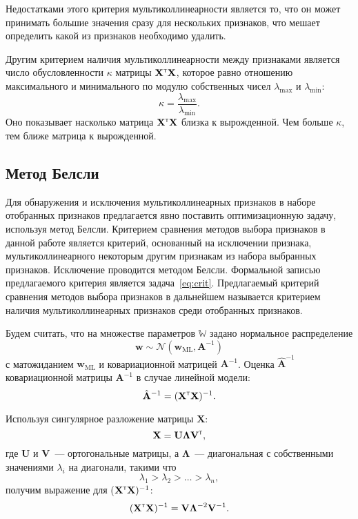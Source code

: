 \documentclass[a4paper,12pt]{article}
\newcommand{\bw}{\mathbf{w}}
\newcommand{\bX}{\mathbf{X}}
\newcommand{\bA}{\mathbf{A}}
\newcommand{\bU}{\mathbf{U}}
\newcommand{\bV}{\mathbf{V}}
\newcommand{\T}{{\text{\tiny\sffamily\upshape\mdseries T}}}
\begin{document}
Недостатками этого критерия мультиколлинеарности является то, что он может принимать большие значения сразу для нескольких признаков, что мешает определить какой из признаков необходимо удалить.   

Другим критерием наличия мультиколлинеарности между признаками является число обусловленности $\kappa$ матрицы $\bX^{\T}\bX$, которое равно отношению максимального и минимального по модулю собственных чисел $\lambda_{\mathrm{max}}$ и $\lambda_{\mathrm{min}}$:
\begin{equation*}
\kappa = \frac{\lambda_{\mathrm{max}}}{\lambda_{\mathrm{min}}}.
\label{eq:condnum}
\end{equation*} 
Оно показывает насколько матрица $\bX^{\T}\bX$ близка к вырожденной. Чем больше $\kappa$, тем ближе матрица к вырожденной.   

\subsection{Метод Белсли}
Для обнаружения и исключения мультиколлинеарных признаков в наборе отобранных признаков предлагается явно поставить оптимизационную задачу, используя метод Белсли. Критерием сравнения методов выбора признаков в данной работе является критерий, основанный на исключении признака, мультиколлинеарного некоторым другим признакам из набора выбранных признаков. Исключение проводится методом Белсли. Формальной записью предлагаемого критерия является задача~\eqref{eq:crit}. Предлагаемый критерий сравнения методов выбора признаков в дальнейшем называется критерием наличия мультиколлинеарных признаков среди отобранных признаков.  

Будем считать, что на множестве параметров $\mathbb{W}$ задано нормальное распределение 
\[
\bw \sim \mathcal{N}(\bw_{\mathrm{ML}}, \mathbf{A}^{-1})
\]   
с матожиданием $\bw_{\mathrm{ML}}$ и ковариационной матрицей $\mathbf{A}^{-1}$.
Оценка $\hat{\bA}^{-1}$ ковариационной матрицы $\bA^{-1}$ в случае линейной модели:
\[
\hat{\bA}^{-1} = (\bX^{\T}\bX)^{-1}.
\]

Используя сингулярное разложение матрицы $\bX$:
\[
\bX = \bU \boldsymbol{\Lambda} \bV^{\T},
\]
где $\bU$ и $\bV$~--- ортогональные матрицы, а $\boldsymbol{\Lambda}$~--- диагональная с собственными значениями $\lambda_i$ на диагонали, такими что
\[
\lambda_1 > \lambda_2 > \ldots > \lambda_n, 
\] 
получим выражение для ($\bX^{\T}\bX)^{-1}$: 
\begin{equation*}
(\bX^{\T}\bX)^{-1} = \bV\boldsymbol{\Lambda}^{-2}\bV^{-1}.
\end{equation*}
 
\end{document}
